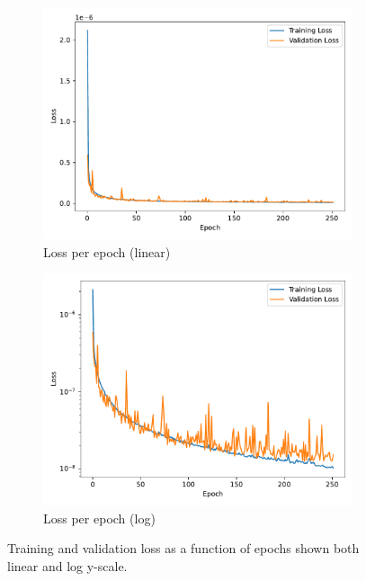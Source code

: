\begin{figure}[h]
    \centering
    \begin{subfigure}[h]{0.45\linewidth}
    \includegraphics[scale=0.45]{figs/ch6/epoch_vs_loss.pdf}%
    \caption{Loss per epoch (linear)}
    \end{subfigure}
    \hfill
    \begin{subfigure}[h]{0.45\linewidth}
    \includegraphics[scale=0.45]{figs/ch6/epoch_vs_loss_log.pdf}%
    \caption{Loss per epoch (log)}
    \end{subfigure}
    \hfill
    \caption{Training and validation loss as a function of epochs shown both linear and log y-scale.}
\label{fig:training-stats}
\end{figure}

